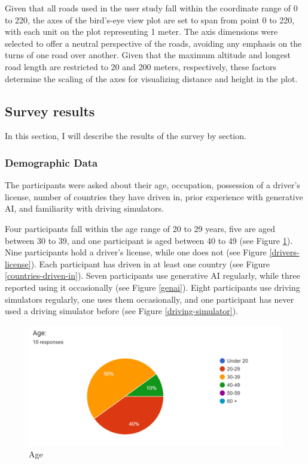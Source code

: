 Given that all roads used in the user study fall within the coordinate range of 0 to 220, the axes of the bird's-eye view plot are set to span from point 0 to 220, with each unit on the plot representing 1 meter. The axis dimensions were selected to offer a neutral perspective of the roads, avoiding any emphasis on the turns of one road over another. Given that the maximum altitude and longest road length are restricted to 20 and 200 meters, respectively, these factors determine the scaling of the axes for visualizing distance and height in the plot.

\subsection{Survey results}
In this section, I will describe the results of the survey by section.
\subsubsection{Demographic Data}
The participants were asked about their age, occupation, possession of a driver's license, number of countries they have driven in, prior experience with generative AI, and familiarity with driving simulators.

Four participants fall within the age range of 20 to 29 years, five are aged between 30 to 39, and one participant is aged between 40 to 49 (see Figure \ref{age}). Nine participants hold a driver's license, while one does not (see Figure \ref{drivers-license}). Each participant has driven in at least one country (see Figure \ref{countries-driven-in}). Seven participants use generative AI regularly, while three reported using it occasionally (see Figure \ref{genai}). Eight participants use driving simulators regularly, one uses them occasionally, and one participant has never used a driving simulator before (see Figure \ref{driving-simulator}).

\begin{figure}[H]
    \centering
    \includegraphics[width=0.6\linewidth]{images/age.png}
    \caption{Age}
    \label{age}
\end{figure}

